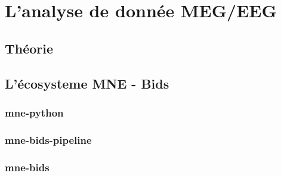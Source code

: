 \chapter{L'analyse de donnée MEG/EEG}

\section{Théorie}

\section{L'écosysteme MNE - Bids}


\subsection{mne-python}

\subsection{mne-bids-pipeline}

\subsection{mne-bids}